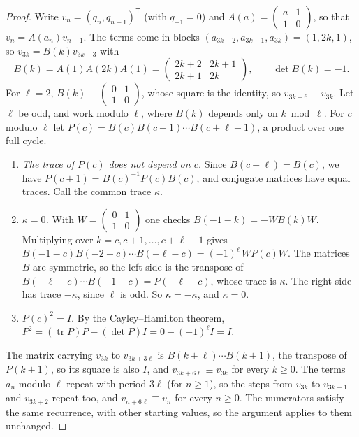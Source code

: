 \begin{proof}
Write $v_n = (q_n, q_{n-1})^{\mathsf T}$ (with $q_{-1} = 0$) and $A(a) = \left(\begin{smallmatrix} a & 1\\ 1 & 0\end{smallmatrix}\right)$, so that $v_n = A(a_n)v_{n-1}$. The terms come in blocks $(a_{3k-2}, a_{3k-1}, a_{3k}) = (1, 2k, 1)$, so $v_{3k} = B(k)v_{3k-3}$ with
\[
  B(k) = A(1)A(2k)A(1) = \begin{pmatrix} 2k+2 & 2k+1 \\ 2k+1 & 2k\end{pmatrix}, \qquad \det B(k) = -1.
\]
For $\ell = 2$, $B(k) \equiv \left(\begin{smallmatrix} 0 & 1\\ 1 & 0\end{smallmatrix}\right)$, whose square is the identity, so $v_{3k+6} \equiv v_{3k}$. Let $\ell$ be odd, and work modulo $\ell$, where $B(k)$ depends only on $k \bmod \ell$. For $c$ modulo $\ell$ let $P(c) = B(c)B(c+1)\cdots B(c+\ell-1)$, a product over one full cycle.
\begin{enumerate}[label=(\alph*)]
\item \emph{The trace of $P(c)$ does not depend on $c$.} Since $B(c + \ell) = B(c)$, we have $P(c+1) = B(c)^{-1}P(c)B(c)$, and conjugate matrices have equal traces. Call the common trace $\kappa$.
\item \emph{$\kappa = 0$.} With $W = \left(\begin{smallmatrix} 0 & 1\\ 1 & 0\end{smallmatrix}\right)$ one checks $B(-1-k) = -WB(k)W$. Multiplying over $k = c, c+1, \dots, c+\ell-1$ gives $B(-1-c)B(-2-c)\cdots B(-\ell-c) = (-1)^\ell\,W P(c)W$. The matrices $B$ are symmetric, so the left side is the transpose of $B(-\ell-c)\cdots B(-1-c) = P(-\ell-c)$, whose trace is $\kappa$. The right side has trace $-\kappa$, since $\ell$ is odd. So $\kappa = -\kappa$, and $\kappa = 0$.
\item \emph{$P(c)^2 = I$.} By the Cayley--Hamilton theorem, $P^2 = (\operatorname{tr}P)P - (\det P)I = 0 - (-1)^\ell I = I$.
\end{enumerate}
The matrix carrying $v_{3k}$ to $v_{3k+3\ell}$ is $B(k+\ell)\cdots B(k+1)$, the transpose of $P(k+1)$, so its square is also $I$, and $v_{3k+6\ell} \equiv v_{3k}$ for every $k \ge 0$. The terms $a_n$ modulo $\ell$ repeat with period $3\ell$ (for $n \ge 1$), so the steps from $v_{3k}$ to $v_{3k+1}$ and $v_{3k+2}$ repeat too, and $v_{n+6\ell} \equiv v_n$ for every $n \ge 0$. The numerators satisfy the same recurrence, with other starting values, so the argument applies to them unchanged.
\end{proof}

